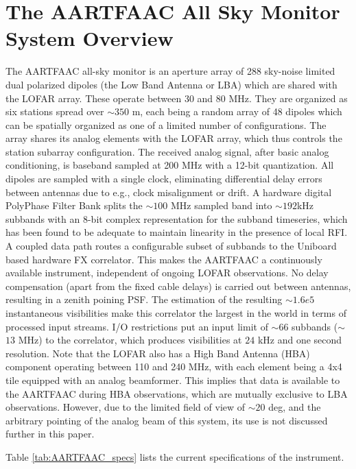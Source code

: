 \documentclass{aa}
\begin{document}
\section{\label{sec:The-AARTFAAC-All}The AARTFAAC All Sky Monitor System
Overview} The  AARTFAAC all-sky  monitor is an  aperture array of  288 sky-noise
limited dual  polarized dipoles (the Low  Band Antenna or LBA)  which are shared
with the LOFAR  array. These operate between 30 and 80  MHz.  They are organized
as  six stations spread  over $\sim$$350$  m, each  being a  random array  of 48
dipoles  which  can  be spatially  organized  as  one  of  a limited  number  of
configurations. The array shares its analog elements with the LOFAR array, which
thus controls  the station subarray  configuration. The received  analog signal,
after basic  analog conditioning, is baseband  sampled at 200 MHz  with a 12-bit
quantization.   All  dipoles  are  sampled  with  a  single  clock,  eliminating
differential delay  errors between antennas  due to e.g., clock  misalignment or
drift.   A hardware  digital PolyPhase  Filter Bank  splits the  $\sim$$100$ MHz
sampled band  into $\sim$$192$kHz subbands with an  8-bit complex representation
for the  subband timeseries,  which has  been found to  be adequate  to maintain
linearity  in  the  presence  of  local  RFI.  A  coupled  data  path  routes  a
configurable   subset  of   subbands   to  the   Uniboard   based  hardware   FX
correlator.  This  makes  the  AARTFAAC  a  continuously  available  instrument,
independent of ongoing LOFAR observations. No delay compensation (apart from the
fixed  cable delays)  is carried  out between  antennas, resulting  in  a zenith
poining  PSF.  The  estimation  of  the  resulting  $\sim$$1.6e5$  instantaneous
visibilities make this correlator the largest in the world in terms of processed
input  streams. I/O  restrictions  put  an input  limit  of $\sim$$66$  subbands
($\sim$$13$ MHz) to the correlator,  which produces visibilities at $24$ kHz and
one second  resolution. Note that the LOFAR  also has a High  Band Antenna (HBA)
component operating between 110 and 240  MHz, with each element being a 4x4 tile
equipped with an  analog beamformer. This implies that data  is available to the
AARTFAAC  during   HBA  observations,  which  are  mutually   exclusive  to  LBA
observations.  However, due to the limited  field of view of $\sim$$20$ deg, and
the  arbitrary pointing  of  the analog  beam of  this  system, its  use is  not
discussed further in this paper.

Table \ref{tab:AARTFAAC_specs} lists the current specifications of
the instrument. 
\end{document}
